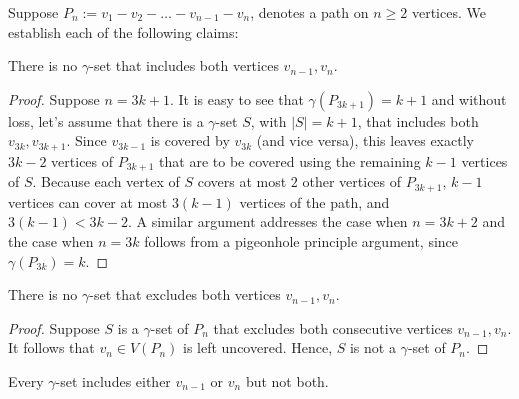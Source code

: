 \documentclass[twoside,12pt]{article}
\begin{document}
Suppose $P_n:=v_1-v_2-\ldots-v_{n-1}-v_n$, denotes a path on $n\ge 2$ vertices. We establish each of the following claims:
\begin{claim}{\label{c1}}
	There is no $\gamma$-set that includes both vertices $v_{n-1},v_n$. 
\end{claim}
\begin{proof}
	Suppose $n=3k+1$. It is easy to see that $\gamma(P_{3k+1})=k+1$ and without loss, let's assume that there is a $\gamma$-set $S$, with $|S|=k+1$, that includes both  $v_{3k},v_{3k+1}$. Since $v_{3k-1}$ is covered by $v_{3k}$ (and vice versa), this leaves exactly $3k-2$ vertices of $P_{3k+1}$ that are to be covered using the remaining $k-1$ vertices of $S$. Because each vertex of $S$ covers at most $2$ other vertices of $P_{3k+1}$, $k-1$ vertices can cover at most $3(k-1)$ vertices of the path, and $3(k-1)<3k-2$. A similar argument addresses the case when $n=3k+2$ and the case when $n=3k$ follows from a pigeonhole principle argument, since $\gamma(P_{3k})=k$.
\end{proof}

\begin{claim}{\label{c2}}
	There is no $\gamma$-set that excludes both vertices $v_{n-1},v_n$. 
\end{claim}
\begin{proof}
	Suppose $S$ is a $\gamma$-set of $P_n$ that excludes both consecutive vertices $v_{n-1},v_n$. It follows that $v_n\in V(P_n)$ is left uncovered. Hence, $S$ is not a $\gamma$-set of $P_n$.
\end{proof}

\begin{claim}{\label{c3}}
	Every $\gamma$-set includes either $v_{n-1}$ or $v_n$ but not both. 
\end{claim}
\end{document}
